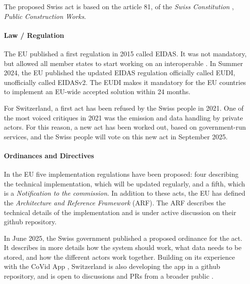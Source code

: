 The proposed Swiss \eid act is based on the article 81, of the \emph{Swiss Constitution} \cite{SwissConstitution}, \emph{Public Construction Works}.

\paragraph{Law / Regulation}

The EU published a first regulation in 2015 called EIDAS\cite{EIDAS}.
It was not mandatory, but allowed all member states to start working on an
interoperable \eid.
In Summer 2024, the EU published the updated EIDAS regulation 
officially called EUDI\cite{EUDI}, unofficially called EIDASv2.
The EUDI makes it mandatory for the EU countries to implement an EU-wide accepted
\eid solution within 24 months.

For Switzerland, a first \eid act has been refused by the Swiss people in 2021\cite{CHeID21}.
One of the most voiced critiques in 2021 was the emission and data handling by
private actors.
For this reason, a new \eid act has been worked out, based on government-run services,
and the Swiss people will vote on this new act in September 2025\cite{SwiyuAct25}.

\paragraph{Ordinances and Directives}

In the EU five implementation regulations have been proposed\cite{EUDIReg24}:
four describing the technical implementation, which will be
updated regularly, and a fifth, which is a \emph{Notification to the commission}.
In addition to these acts, the EU has defined the \emph{Architecture and Reference Framework
}(ARF)\cite{EUARF25}.
The ARF describes the technical details of the implementation and is under active
discussion on their github repository.

In June 2025, the Swiss government published a proposed ordinance for the
\eid act\cite{SwiyuOrdinance25}.
It describes in more details how the system should work, what data needs to be stored,
and how the different actors work together.
Building on its experience with the CoVid App \cite{SwisscovidGithub}, Switzerland is also
developing the \swiyu app in a github repository, and is open to discussions
and PRs from a broader public \cite{SwiyuGithub}.